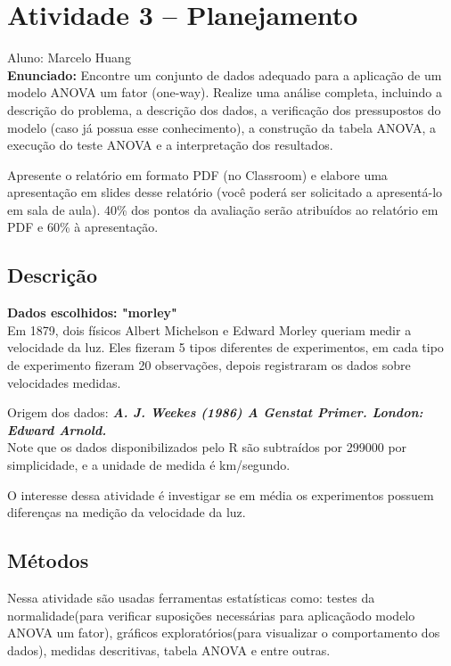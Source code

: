 \documentclass[12pt]{article}
\begin{document}
\section*{Atividade 3 -- Planejamento}
Aluno: Marcelo Huang\\

\textbf{Enunciado:}  
Encontre um conjunto de dados adequado para a aplicação de um modelo ANOVA um fator (one-way).
Realize uma análise completa, incluindo a descrição do problema, a descrição dos dados,
 a verificação dos pressupostos do modelo (caso já possua esse conhecimento), 
 a construção da tabela ANOVA, 
 a execução do teste ANOVA 
 e a interpretação dos resultados.

Apresente o relatório em formato PDF (no Classroom) 
e elabore uma apresentação em slides desse relatório 
(você poderá ser solicitado a apresentá-lo em sala de aula). 
40\% dos pontos da avaliação serão atribuídos ao relatório em PDF e 60\% à apresentação.

\subsection*{Descrição}

\textbf{ Dados escolhidos: "morley"}
\\

Em 1879, dois físicos Albert Michelson e Edward Morley queriam medir a velocidade da luz.
Eles fizeram 5 tipos diferentes de experimentos, em cada tipo de experimento fizeram 
20 observações, depois registraram os dados sobre velocidades medidas.

Origem dos dados: \textbf{\textit{A. J. Weekes (1986) A Genstat Primer. London: Edward Arnold.}} 
\\

Note que os dados disponibilizados pelo R são subtraídos por 299000 por simplicidade,
 e a unidade de medida é km/segundo.

O interesse dessa atividade é investigar se em média os experimentos possuem diferenças 
na medição da velocidade da luz.

\subsection*{Métodos}

Nessa atividade são usadas ferramentas estatísticas como: testes da normalidade(para verificar suposições necessárias 
para aplicaçãodo modelo ANOVA um fator),
gráficos exploratórios(para visualizar o comportamento dos dados),
medidas descritivas, tabela ANOVA e entre outras.
\end{document}
